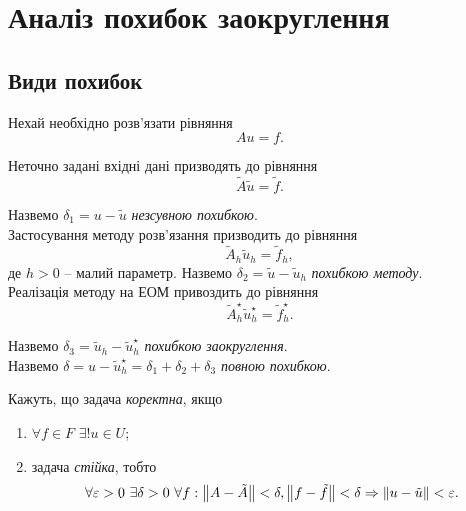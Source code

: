 



\section{Аналіз похибок заокруглення}
	
\subsection{Види похибок}

Нехай необхідно розв'язати рівняння \begin{equation} \label{eq:au=f} Au = f. \end{equation}

Неточно задані вхідні дані призводять до рівняння \begin{equation} \label{eq:au=f 2} \tilde A \tilde u = \tilde f.\end{equation}

Назвемо $\delta_1 = u - \tilde u$ \textit{незсувною похибкою}.\\

Застосування методу розв'язання  призводить до рівняння \begin{equation} \label{eq:au=f 3} \tilde A_h \tilde u_h = \tilde f_h, \end{equation} де $h > 0$ -- малий параметр. Назвемо $\delta_2 = \tilde u - \tilde u_h$ \textit{похибкою методу}.\\

Реалізація методу на ЕОМ привоздить до рівняння \begin{equation} \label{eq:au=f 4} \tilde A_h^\star \tilde u_h^\star = \tilde f_h^\star. \end{equation} 

Назвемо $\delta_3 = \tilde u_h - \tilde u_h^\star$ \textit{похибкою заокруглення}. \\

Назвемо $\delta = u - \tilde u_h^\star = \delta_1 + \delta_2 + \delta_3$ \textit{повною похибкою}.

\begin{definition}
	Кажуть, що задача  \textit{коректна}, якщо 
	\begin{enumerate}
		\item $\forall f\in F$ $\exists! u\in U$;
		\item задача  \textit{стійка}, тобто \[\forall \varepsilon > 0 \text{ } \exists \delta > 0 \text{ } \forall f: \left\|A-\tilde A\right\|<\delta, \left\|f-\tilde f\right\|<\delta \Rightarrow \left\|u-\tilde u\right\|<\varepsilon.\]
	\end{enumerate}
\end{definition}

